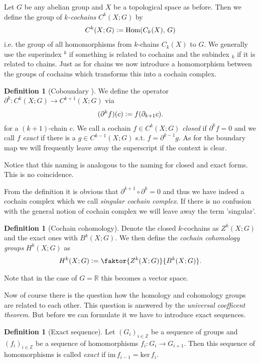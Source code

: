\documentclass[12pt,a4paper]{article}
\numberwithin{equation}{subsection}
\numberwithin{lemma}{subsection}
\theoremstyle{definition}
\newtheorem{definition}[lemma]{Definition}
\newcommand{\integers}{\mathbb{Z}}
\newcommand{\real}{\mathbb{R}}
\begin{document}
Let $G$ be any abelian group and $X$ be a topological space as before. 
Then we define the group 
of \textit{$k$-cochains} $C^k(X;G)$ by
\begin{align*}
    C^k(X;G) \vcentcolon= \text{Hom}(C_k(X),\,G)
\end{align*}
i.e. the group of all homomorphisms from $k$-chains $C_k(X)$ to $G$. 
We generally use the superindex $^k$ if something is related to 
cochains and the subindex $_k$ if it is related to chains. 
Just as for chains we now introduce a homomorphism between the groups of cochains
which transforms this into a cochain complex.
\begin{definition}[Coboundary ]
    We define the operator $\partial^k: C^k(X;G) \rightarrow C^{k+1}(X;G)$ via
    \begin{align*}
        (\partial^k f) (c) \vcentcolon= f(\partial_{k+1} c).
    \end{align*}
    for a $(k+1)$-chain $c$.
    We call a cochain $f \in C^k(X;G)$ \textit{closed} if $\partial^k f = 0$ 
    and we call $f$
    \textit{exact} if there is a $g \in C^{k-1}(X;G)$ s.t. $f = \partial^{k-1} g$.
    As for the boundary map we will frequently leave away the superscript if
    the context is clear.
\end{definition}
Notice that this naming is analogous to the naming for closed and exact forms. 
This is no coincidence.

From the definition it is obvious that $\partial^{k+1} \circ \partial^{k} = 0$ 
and thus we have indeed a cochain complex which we call \textit{singular cochain 
complex}. If there is no confusion with the general notion of cochain complex
we will leave away the term 'singular'.
\begin{definition}[Cochain cohomology]
    Denote the closed $k$-cochains as $Z^k(X;G)$ and the 
    exact ones with $B^k(X;G)$. 
    We then define the \textit{cochain cohomology groups}
    $H^k(X;G)$ as
    \begin{align*}
        H^k(X;G) \vcentcolon= \faktor{Z^k(X;G)}{B^k(X;G)}.
    \end{align*}
\end{definition}
Note that in the case of $G = \real$ this becomes a vector space.

Now of course there is the question how the homology and cohomology groups 
are related to each other. This question is answered by the
\textit{universal coefficent theorem}. But before we can formulate it we have 
to introduce exact sequences.
\begin{definition}[Exact sequence]
    Let $(G_i)_{i\in \integers}$ be a sequence of groups and 
    $(f_i)_{i \in \integers}$ be a sequence of homomorphisms
    $f_i: G_i \rightarrow G_{i+1}$. Then this sequence of homomorphisms is
    called \textit{exact} if $\text{im}\,f_{i-1} = \text{ker}\,f_i$.
\end{definition}
\end{document}
